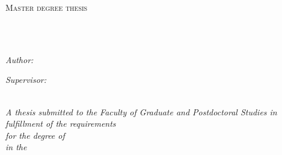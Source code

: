 \documentclass[
12pt, %
oneside, %
english, %
singlespacing, %
headsepline, %
]{MastersDoctoralThesis} %
\author{Qiangsen He}
\begin{document}
\frontmatter %

\pagestyle{plain} %


\begin{titlepage}
\begin{center}

\vspace*{.06\textheight}
{\scshape\LARGE \univname\par}\vspace{1.5cm} %
\textsc{\Large Master degree thesis}\\[0.5cm] %

\HRule \\[0.4cm] %
{\huge \bfseries \ttitle\par}\vspace{0.4cm} %
\HRule \\[1.5cm] %
 
\begin{minipage}[t]{0.4\textwidth}
\begin{flushleft} \large
\emph{Author:}\\
\href{}{\authorname} %
\end{flushleft}
\end{minipage}
\begin{minipage}[t]{0.4\textwidth}
\begin{flushright} \large
\emph{Supervisor:} \\
\href{}{\supname} %
\end{flushright}
\end{minipage}\\[3cm]
 

\large \textit{A thesis submitted to the Faculty of Graduate and Postdoctoral Studies in fulfillment of the requirements\\ for the degree of \degreename}\\[0.3cm] %
\textit{in the}\\[0.4cm]
\groupname\\\deptname\\[2cm] %



\end{center}
\end{titlepage}
\end{document}
